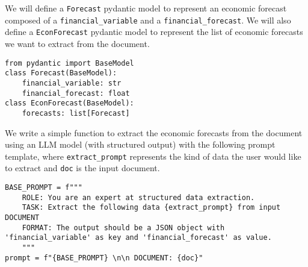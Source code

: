 
We will define a \texttt{Forecast} pydantic model to represent an economic forecast composed of a \texttt{financial\_variable} and a \texttt{financial\_forecast}. We will also define a \texttt{EconForecast} pydantic model to represent the list of economic forecasts we want to extract from the document.

\begin{verbatim}
from pydantic import BaseModel
class Forecast(BaseModel):
    financial_variable: str
    financial_forecast: float
class EconForecast(BaseModel):
    forecasts: list[Forecast]
\end{verbatim}

We write a simple function to extract the economic forecasts from the document using an LLM model (with structured output) with the following prompt template, where \texttt{extract\_prompt} represents the kind of data the user would like to extract and \texttt{doc} is the input document.

\begin{verbatim}
BASE_PROMPT = f"""
    ROLE: You are an expert at structured data extraction. 
    TASK: Extract the following data {extract_prompt} from input DOCUMENT
    FORMAT: The output should be a JSON object with 'financial_variable' as key and 'financial_forecast' as value.
    """
prompt = f"{BASE_PROMPT} \n\n DOCUMENT: {doc}"
\end{verbatim}

